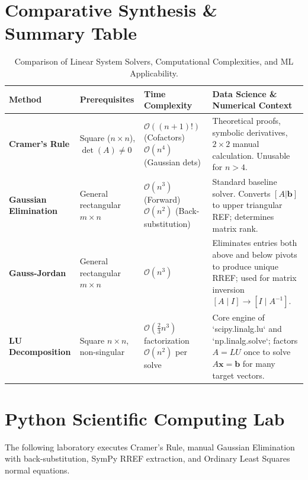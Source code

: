 \section{Comparative Synthesis \& Summary Table}

\begin{table}[htbp]
\centering
\small
\begin{tabular}{p{2.6cm} p{2.8cm} p{3.4cm} p{4.6cm}}
\toprule
\textbf{Method} & \textbf{Prerequisites} & \textbf{Time Complexity} & \textbf{Data Science \& Numerical Context} \\
\midrule
\textbf{Cramer's Rule} & Square ($n \times n$), $\det(A) \neq 0$ & $\mathcal{O}((n+1)!)$ (Cofactors) \newline $\mathcal{O}(n^4)$ (Gaussian dets) & Theoretical proofs, symbolic derivatives, $2 \times 2$ manual calculation. Unusable for $n > 4$. \\
\addlinespace
\textbf{Gaussian Elimination} & General rectangular $m \times n$ & $\mathcal{O}(n^3)$ (Forward) \newline $\mathcal{O}(n^2)$ (Back-substitution) & Standard baseline solver. Converts $[A|\mathbf{b}]$ to upper triangular REF; determines matrix rank. \\
\addlinespace
\textbf{Gauss-Jordan} & General rectangular $m \times n$ & $\mathcal{O}(n^3)$ & Eliminates entries both above and below pivots to produce unique RREF; used for matrix inversion $[A \mid I] \to [I \mid A^{-1}]$. \\
\addlinespace
\textbf{LU Decomposition} & Square $n \times n$, non-singular & $\mathcal{O}(\frac{2}{3}n^3)$ factorization \newline $\mathcal{O}(n^2)$ per solve & Core engine of `scipy.linalg.lu` and `np.linalg.solve`; factors $A = LU$ once to solve $A\mathbf{x} = \mathbf{b}$ for many target vectors. \\
\bottomrule
\end{tabular}
\caption{Comparison of Linear System Solvers, Computational Complexities, and ML Applicability.}
\end{table}

\section{Python Scientific Computing Lab}

The following laboratory executes Cramer's Rule, manual Gaussian Elimination with back-substitution, SymPy RREF extraction, and Ordinary Least Squares normal equations.

